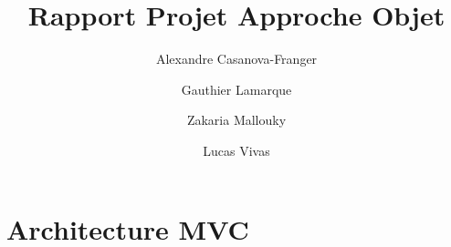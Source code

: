\documentclass{article}
\title{Rapport Projet Approche Objet}
\author{Alexandre Casanova-Franger\\
        \and
        Gauthier Lamarque\\
        \and
        Zakaria Mallouky\\
        \and
        Lucas Vivas\\
        }
\begin{document}
  \maketitle
  \section{Architecture MVC}
\end{document}
